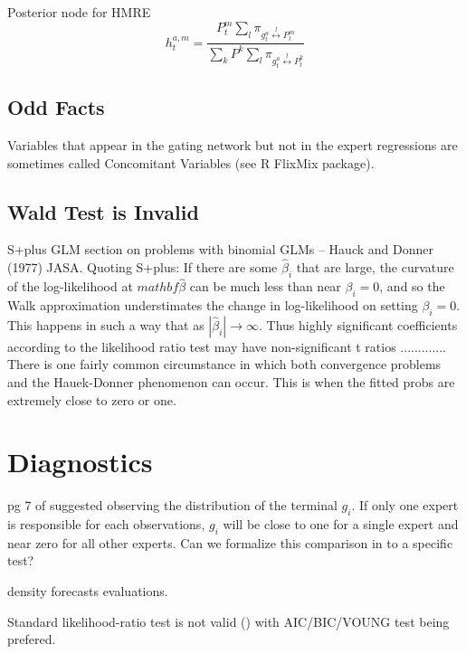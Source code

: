 \documentclass[12pt]{article}
\newcommand{\sumgateprod}[3]{\pi_{#1 \overset{#3}{\longleftrightarrow} #2}}
\newcommand{\shortsum}[1]{\sum \nolimits_{#1}}
\begin{document}
Posterior node for HMRE
\begin{equation} 
  h^{a,m}_{t} = \frac{P^{m}_{t} \shortsum{l} \sumgateprod{g^{a}_{t}}{P^{m}_{t}}{l}}{\sum_{k} P^{k} \shortsum{l} \sumgateprod{g^{a}_{t}}{P^{k}_{t}}{l}}
\end{equation}



\subsection{Odd Facts}

Variables that appear in the gating network but not in the expert regressions
are sometimes called Concomitant Variables (see R FlixMix package).




\subsection{Wald Test is Invalid}
S+plus GLM section on problems with binomial GLMs
  -- Hauck and Donner (1977) JASA. Quoting S+plus: If there are
  some $\hat{\beta}_{i}$ that are large, the curvature of the log-likelihood at
  $mathbf{\hat{\beta}}$ can be much less than near $\beta_{i}=0$, and so the Walk
  approximation understimates the change in log-likelihood on setting $\beta_{i}=0$.
  This happens in such a way that as $|\hat{\beta}_{i}| \rightarrow \infty$. Thus
  highly significant coefficients according to the likelihood ratio test may have
  non-significant t ratios ............. There is one fairly common circumstance
  in which both convergence problems and the Hauek-Donner phenomenon can occur.
  This is when the fitted probs are extremely close to zero or one.



\section{Diagnostics}
pg 7 of \cite{WMS1995} suggested observing the distribution of the terminal
$g_{i}$. If only one expert is responsible for each observations, $g_{i}$ will
be close to one for a single expert and near zero for all other experts.
Can we formalize this comparison in to a specific test?

density forecasts evaluations.

Standard likelihood-ratio test is not valid (\cite{CarvalhoTanner2006}) with
AIC/BIC/VOUNG test being prefered.




\end{document}
